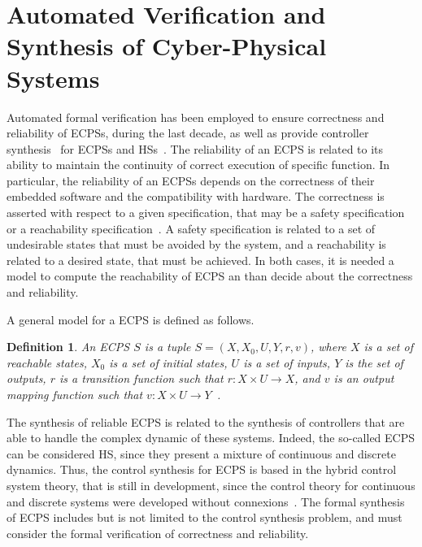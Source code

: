 \documentclass{cta-author}
\newtheorem{definition}{Definition}{}
\begin{document}
\section{Automated Verification and Synthesis of Cyber-Physical Systems}
\label{sec:model}

{\color{blue}

Automated formal verification has been employed to ensure correctness and reliability of ECPSs, during the last decade, as well as provide controller synthesis~\cite{Nilsson16,Prabhakar17,EsmaeilZadehSoudjani17,Ames17,tabuada2009verification,Hasuo17,Zamani15} for ECPSs and HSs~\cite{Clarke11,Aerts17,Zhang14,Simko14,Sanwal13,Lee13,Li14}. The reliability of an ECPS is related to its ability to maintain the continuity of correct execution of specific function. In particular, the reliability of an ECPSs depends on the correctness of their embedded software and the compatibility with hardware. The correctness is asserted with respect to a given specification, that may be a safety specification or a reachability specification~\cite{Jhala:2009:SMC:1592434.1592438}. A safety specification is related to  a set of undesirable states that must be avoided by the system, and a reachability is related to a desired state, that must be achieved. In both cases, it is needed a model to compute the reachability of ECPS an than decide about the correctness and reliability.

A general model for a ECPS is defined as follows. 

\begin{definition}
	An ECPS $S$ is a tuple $S=(X,X_{0},U,Y,r,v)$, where $X$ is a set of reachable states, $X_{0}$ is a set of initial states, $U$ is a set of inputs, $Y$ is the set of outputs, $r$ is a transition function such that $r:X\times U \rightarrow X$, and  $v$ is an output mapping function such that $v:X\times U \rightarrow Y$~\cite{Rungger16,Alur00,Girard11}.
\end{definition}



The synthesis of reliable ECPS is related to the synthesis of controllers that are able to handle the complex dynamic of these systems. Indeed, the so-called ECPS can be considered HS, since they present a mixture of continuous and discrete dynamics. Thus, the control synthesis for ECPS is based in the hybrid control system theory, that is still in development, since the control theory for continuous and discrete systems were developed without connexions~\cite{lunze_lamnabhi-lagarrigue_2009}. The formal synthesis of ECPS includes but is not limited to the control synthesis problem, and must consider the formal verification of correctness and reliability.

}
\end{document}
